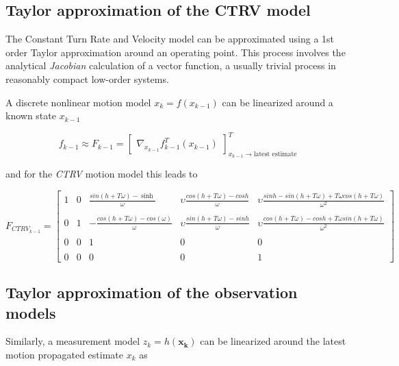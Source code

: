\subsection{Taylor approximation of the CTRV model}

The Constant Turn Rate and Velocity model can be approximated using a 1st order Taylor approximation around an operating point. This process involves the analytical \emph{Jacobian} calculation of a vector function, a usually trivial process in reasonably compact low-order systems.


A discrete nonlinear motion model $x_{k} = f({x}_{k-1})$ can be linearized around a known state $x_{k-1}$




\begin{equation}
f_{k-1} \approx F_{k-1} =
\begin{bmatrix}
\nabla_{x_{k-1}} f_{k-1}^{T}(x_{k-1})
\end{bmatrix}_{x_{k-1} \rightarrow\text{latest estimate}}^{T}
\end{equation}


and for the \emph{CTRV} motion   model this leads to




\begin{equation}
F_{{CTRV}_{k-1}} =
\begin{bmatrix}1 &0 &\frac{sin(h+T\omega) - \sinh}{\omega} & \upsilon \frac{cos(h+T\omega)-cosh}{\omega} & \upsilon\frac{sinh -sin(h+T\omega) + T\omega cos(h+T\omega)}{\omega^{2}}\\\\
0 &1 &-\frac{cos(h+T\omega) - cos(\omega)}{\omega} &\upsilon \frac{sin(h+T\omega)-sinh}{\omega} & \upsilon\frac{cos(h + T\omega) -cosh + T\omega sin(h+T\omega)}{\omega^{2}}\\\\
0 &0 &1 &0 &0 \\\\
0 &0 &0 &0 &1\end{bmatrix}
\end{equation}


\subsection{Taylor approximation of the observation models}


Similarly, a measurement model $z_k=h(\mathbf{x_k})$ can be linearized around the latest motion propagated estimate $x_{k}$ as


